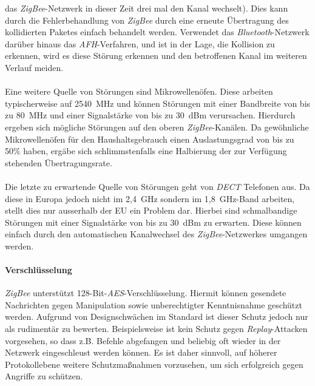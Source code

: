                 das \emph{ZigBee}-Netzwerk in dieser Zeit drei mal den Kanal wechselt). Dies kann durch die Fehlerbehandlung
                von \emph{ZigBee} durch eine erneute Übertragung des kollidierten Paketes einfach behandelt werden. Verwendet
                das \emph{Bluetooth}-Netzwerk darüber hinaus das \emph{AFH}-Verfahren, und ist in der Lage, die Kollision zu
                erkennen, wird es diese Störung erkennen und den betroffenen Kanal im weiteren Verlauf meiden.\\
                \\
                Eine weitere Quelle von Störungen sind Mikrowellenöfen. Diese arbeiten typischerweise
                auf 2540~MHz und können Störungen mit einer Bandbreite von bis zu 80~MHz und einer Signalstärke
                von bis zu 30~dBm verursachen. Hierdurch ergeben sich mögliche Störungen auf den
                oberen \emph{ZigBee}-Kanälen. Da gewöhnliche Mikrowellenöfen für den Haushaltsgebrauch einen 
                Auslastungsgrad von bis zu 50\% haben, ergäbe sich schlimmstenfalls eine Halbierung der
                zur Verfügung stehenden Übertragungsrate.\\
                \\
                Die letzte zu erwartende Quelle von Störungen geht von \emph{DECT} Telefonen aus. Da diese in Europa
                jedoch nicht im 2,4~GHz sondern im 1,8~GHz-Band arbeiten, stellt dies nur ausserhalb der EU ein
                Problem dar. Hierbei sind schmalbandige Störungen mit einer Signalstärke von bis zu 30~dBm 
                zu erwarten. Diese können einfach durch den automatischen Kanalwechsel des \emph{ZigBee}-Netzwerkes
                umgangen werden.\\

            \paragraph{Verschlüsselung}\label{ZigBee Sicherheit}
                \emph{ZigBee} unterstützt 128-Bit-\emph{AES}-Verschlüsselung. Hiermit können gesendete Nachrichten 
                gegen Manipulation sowie unberechtigter Kenntnisnahme geschützt werden. Aufgrund von Designschwächen 
                im Standard ist dieser Schutz jedoch nur als rudimentär zu bewerten. Beispielsweise ist
                kein Schutz gegen \emph{Replay}-Attacken vorgesehen, so dass z.B. Befehle abgefangen und beliebig oft
                wieder in der Netzwerk eingeschleust werden können. Es ist daher sinnvoll, auf höherer 
                Protokollebene weitere Schutzmaßnahmen vorzusehen, um sich erfolgreich gegen Angriffe zu
                schützen.

